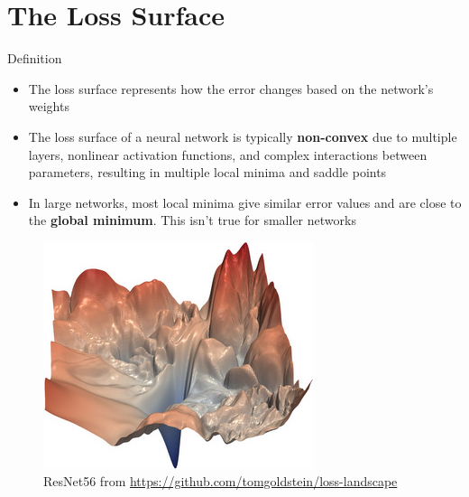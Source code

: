 \documentclass[serif, aspectratio=169]{beamer}
\begin{document}
\section{The Loss Surface}
\begin{frame}{Definition}
\begin{minipage}{0.5\linewidth}
    \begin{itemize}
        \item The loss surface represents how the error changes based on the network's weights
        \item The loss surface of a neural network is typically \textbf{non-convex} due to multiple layers, nonlinear activation functions, and complex interactions between parameters, resulting in multiple local minima and saddle points
        \item In large networks, most local minima give similar error values and are close to the \textbf{global minimum}. This isn't true for smaller networks
    \end{itemize}
\end{minipage}%
\begin{minipage}{0.5\linewidth}
    \begin{figure}[h]
        \centering
        \includegraphics[height=.5\textheight]{pic/resnet56_noshort_small.jpg}
        \caption{\footnotesize ResNet56 from \url{https://github.com/tomgoldstein/loss-landscape}}
    \end{figure}
\end{minipage}
\end{frame}
\end{document}

